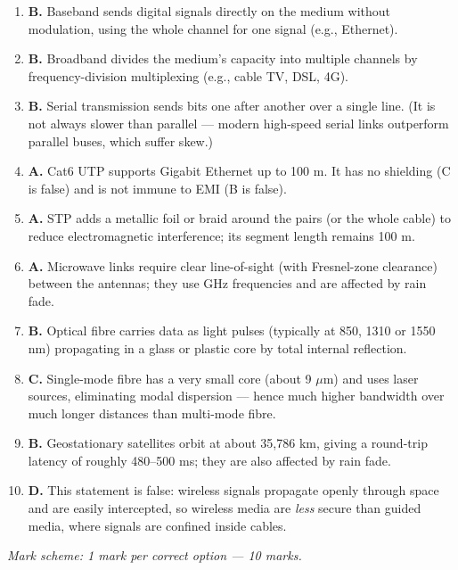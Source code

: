 \documentclass[11pt]{article}
\begin{document}
\begin{corrige}
\begin{enumerate}
\item \textbf{B.} Baseband sends digital signals directly on the medium without modulation, using the whole channel for one signal (e.g., Ethernet).
\item \textbf{B.} Broadband divides the medium's capacity into multiple channels by frequency-division multiplexing (e.g., cable TV, DSL, 4G).
\item \textbf{B.} Serial transmission sends bits one after another over a single line. (It is not always slower than parallel — modern high-speed serial links outperform parallel buses, which suffer skew.)
\item \textbf{A.} Cat6 UTP supports Gigabit Ethernet up to 100 m. It has no shielding (C is false) and is not immune to EMI (B is false).
\item \textbf{A.} STP adds a metallic foil or braid around the pairs (or the whole cable) to reduce electromagnetic interference; its segment length remains 100 m.
\item \textbf{A.} Microwave links require clear line-of-sight (with Fresnel-zone clearance) between the antennas; they use GHz frequencies and are affected by rain fade.
\item \textbf{B.} Optical fibre carries data as light pulses (typically at 850, 1310 or 1550 nm) propagating in a glass or plastic core by total internal reflection.
\item \textbf{C.} Single-mode fibre has a very small core (about 9 $\mu$m) and uses laser sources, eliminating modal dispersion — hence much higher bandwidth over much longer distances than multi-mode fibre.
\item \textbf{B.} Geostationary satellites orbit at about 35,786 km, giving a round-trip latency of roughly 480--500 ms; they are also affected by rain fade.
\item \textbf{D.} This statement is false: wireless signals propagate openly through space and are easily intercepted, so wireless media are \emph{less} secure than guided media, where signals are confined inside cables.
\end{enumerate}
\emph{Mark scheme: 1 mark per correct option — 10 marks.}
\end{corrige}
\end{document}
